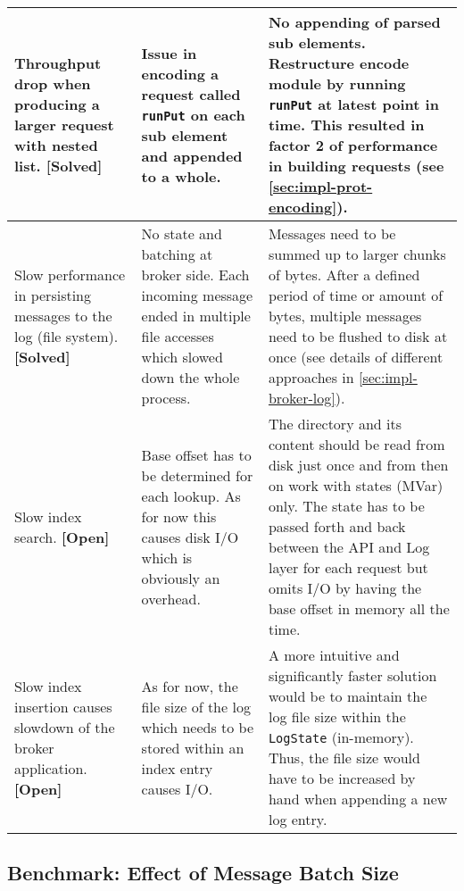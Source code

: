 \begin{table}[H]
\begin{tabular}{|p{3cm}|p{4.5cm}|p{6cm}|}
Throughput drop when producing a larger request with nested list. \textbf{[Solved]}
& Issue in encoding a request called \lstinline{runPut} on each sub element and
appended to a whole.
& No appending of parsed sub elements. Restructure encode module by running
\lstinline{runPut} at latest point in time. This resulted in factor 2 of performance in building requests (see \ref{sec:impl-prot-encoding}).                                                                                                                                      \\ \hline
Slow performance in persisting messages to the log (file system). \textbf{[Solved]}                                & No state and batching at broker side. Each incoming message ended in multiple file accesses which slowed down the whole process.                                                                                                                                & Messages need to be summed up to larger chunks of bytes. After a defined period of time or amount of bytes, multiple messages need to be flushed to disk at once (see details of different approaches in \ref{sec:impl-broker-log}).                                                                                                                                      \\ \hline
Slow index search. \textbf{[Open]} & Base offset has to be determined for each lookup. As for now
this causes disk I/O which is obviously an overhead. & The directory and
its content should be read from disk just once and from then on work with states
(MVar) only. The state has to be passed forth and back between the API and Log
layer for each request but omits I/O by having the base offset in memory all the time. \\ \hline
Slow index insertion causes slowdown of the broker application. \textbf{[Open]} & As for now, the
file size of the log which needs to be stored within an index entry causes I/O.
& A more intuitive and significantly faster solution would be to maintain the log file
size within the \lstinline{LogState} (in-memory). Thus, the file size would have to be
increased by hand when appending a new log entry. \\ \hline
\end{tabular}
\end{table}

\newpage
\subsection{Benchmark: Effect of Message Batch Size}
\label{sec:conc-benchmark-1}


